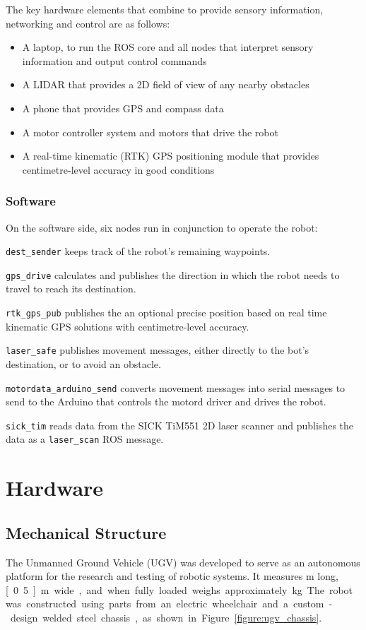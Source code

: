 \documentclass[titlepage,12pt,a4paper]{article}
\begin{document}
The key hardware elements that combine to provide sensory information, networking and control are as follows:

\begin{itemize}
	\item A laptop, to run the ROS core and all nodes that interpret sensory information and output control commands
	\item A LIDAR that provides a 2D field of view of any nearby obstacles
	\item A phone that provides GPS and compass data
	\item A motor controller system and motors that drive the robot
	\item A real-time kinematic (RTK) GPS positioning module that provides centimetre-level accuracy in good conditions
\end{itemize}



\subsubsection{Software}

On the software side, six nodes run in conjunction to operate the robot:

\verb|dest_sender| keeps track of the robot's remaining waypoints.

\verb|gps_drive| calculates and publishes the direction in which the robot needs to travel to reach its destination.

\verb|rtk_gps_pub| publishes the an optional precise position based on real time kinematic GPS solutions with centimetre-level accuracy.

\verb|laser_safe| publishes movement messages, either directly to the bot's destination, or to avoid an obstacle.

\verb|motordata_arduino_send| converts movement messages into serial messages to send to the Arduino that controls the motord driver and drives the robot.

\verb|sick_tim| reads data from the SICK TiM551 2D laser scanner and publishes the data as a \verb|laser_scan| ROS message.

\pagebreak
\section{Hardware}

\subsection{Mechanical Structure}
The Unmanned Ground Vehicle (UGV) was developed to serve as an autonomous platform for the research and testing of robotic systems. It measures \unit[1]{m} long, \unit[0.5]{m} wide, and when fully loaded weighs approximately \unit[50]{kg}. The robot was constructed using parts from an electric wheelchair and a custom-design welded steel chassis, as shown in Figure \ref{figure:ugv_chassis}.
\end{document}
